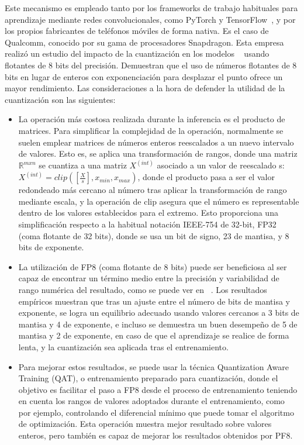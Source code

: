 Este mecanismo es empleado tanto por los frameworks de trabajo habituales para aprendizaje mediante redes convolucionales, como PyTorch \cite{paszke2019pytorch} y TensorFlow~\cite{tensorflow2015-whitepaper}, y por los propios fabricantes de teléfonos móviles de forma nativa. Es el caso de Qualcomm, conocido por su gama de procesadores Snapdragon. Esta empresa realizó un estudio del impacto de la cuantización en los modelos ~\cite{kuzmin2024fp8} usando flotantes de 8 bits del precisión. Demuestran que el uso de números flotantes de 8 bits en lugar de enteros con exponenciación para desplazar el punto ofrece un mayor rendimiento. Las consideraciones a la hora de defender la utilidad de la cuantización son las siguientes:

\begin{itemize}
	\item La operación más costosa realizada durante la inferencia es el producto de matrices. Para simplificar la complejidad de la operación, normalmente se suelen emplear matrices de números enteros reescalados a un nuevo intervalo de valores. Esto es, se aplica una transformación de rangos, donde una matriz $\mathbb{R}^{m x n}$ se cuantiza a una matriz $X^{(int)}$ asociado a un valor de reescalado s: $X^{(int)}=clip([\frac{X}{s}],x_{min},x_{max})$, donde el producto pasa a ser el valor redondeado más cercano al número tras aplicar la transformación de rango mediante escala, y la operación de clip asegura que el número es representable dentro de los valores establecidos para el extremo. Esto proporciona una simplificación respecto a la habitual notación IEEE-754 de 32-bit, FP32 (coma flotante de 32 bits), donde se usa un bit de signo, 23 de mantisa, y 8 bits de exponente.
	\item  La utilización de FP8 (coma flotante de 8 bits) puede ser beneficiosa al ser capaz de encontrar un término medio entre la precisión y variabilidad de rango numérica del resultado, como se puede ver en ~\cite{kuzmin2024fp8}. Los resultados empíricos muestran que tras un ajuste entre el número de bits de mantisa y exponente, se logra un equilibrio adecuado usando valores cercanos a 3 bits de mantisa y 4 de exponente, e incluso se demuestra un buen desempeño de 5 de mantisa y 2 de exponente, en caso de que el aprendizaje se realice de forma lenta, y la cuantización sea aplicada tras el entrenamiento.
	\item Para mejorar estos resultados, se puede usar la técnica Quantization Aware Training (QAT), o entrenamiento preparado para cuantización, donde el objetivo es facilitar el paso a FP8 desde el proceso de entrenamiento teniendo en cuenta los rangos de valores adoptados durante el entrenamiento, como por ejemplo, controlando el diferencial mínimo que puede tomar el algoritmo de optimización. Esta operación muestra mejor resultado sobre valores enteros, pero también es capaz de mejorar los resultados obtenidos por PF8.
\end{itemize}

